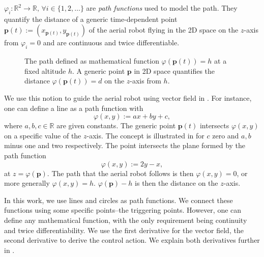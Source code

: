 \begin{highlight}
  \begin{defn}\label{def:paths}
    $\varphi_i:\mathbb{R}^2\rightarrow\mathbb{R},\,\forall i\in\{1,2,\dots\}$ are \emph{path functions} used to model the path. They quantify the distance of a generic time-dependent point $\mathbf{p}(t):=(x_{\mathbf{p}(t)},y_{\mathbf{p}(t)})$ of the aerial robot flying in the 2D space on the $z$-axis from $\varphi_i=0$ and are continuous and twice differentiable. 
  \end{defn}
\end{highlight}

\begin{figure}[t]
  \centering
  
  \caption[Concept of the path and generic point in space]{The path defined as mathematical function $\varphi(\mathbf{p}(t))=h$ at a fixed altitude $h$. A generic point $\mathbf{p}$ in 2D space quantifies the distance $\varphi(\mathbf{p}(t))=d$ on the $z$-axis from $h$.}
  \label{fig:plot1}
\end{figure}

We use this notion to guide the aerial robot using vector field in . For instance, one can define a line as a path function with
\begin{equation}\label{eq:basic-path}
  \varphi(x,y):=ax+by+c,
\end{equation}
where $a,b,c\in\mathbb{R}$ are given constants. The generic point $\mathbf{p}(t)$ intersects $\varphi(x,y)$ on a specific value of the $z$-axis. The concept is illustrated in  for $c$ zero and $a,b$ minus one and two respectively. The point intersects the plane formed by the path function
\begin{equation}
  \varphi(x,y):=2y-x,
\end{equation}
at $z=\varphi(\mathbf{p})$. The path that the aerial robot follows is then $\varphi(x,y)=0$, or more generally $\varphi(x,y)=h$. $\varphi(\mathbf{p})-h$ is then the distance on the $z$-axis.

In this work, we use lines and circles as path functions. We connect these functions using some specific points--the triggering points. However, one can define any mathematical function, with the only requirement being continuity and twice differentiability. We use the first derivative for the vector field, the second derivative to derive the control action. We explain both derivatives further in .


